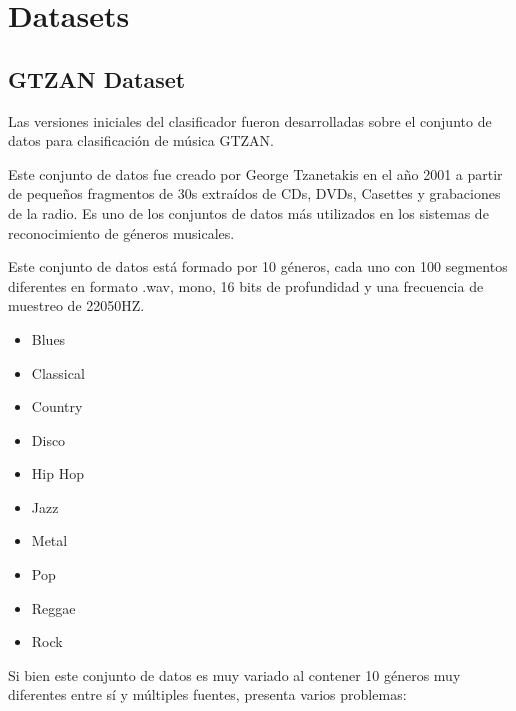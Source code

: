 
\section{Datasets}\label{datasets}

\hypertarget{gtzan-dataset}{%
\subsection{GTZAN Dataset}\label{gtzan-dataset}}

Las versiones iniciales del clasificador fueron desarrolladas sobre el
conjunto de datos para clasificación de música GTZAN.

Este conjunto de datos \cite{gtzan_paper} fue creado por George Tzanetakis en el año 2001 a
partir de pequeños fragmentos de 30s extraídos de CDs, DVDs, Casettes y
grabaciones de la radio. Es uno de los conjuntos de datos más utilizados
en los sistemas de reconocimiento de géneros musicales.

Este conjunto de datos está formado por 10 géneros, cada uno con 100
segmentos diferentes en formato .wav, mono, 16 bits de profundidad y una
frecuencia de muestreo de 22050HZ.

\begin{itemize}
\itemsep0em
\item
  Blues
\item
  Classical
\item
  Country
\item
  Disco
\item
  Hip Hop
\item
  Jazz
\item
  Metal
\item
  Pop
\item
  Reggae
\item
  Rock
\end{itemize}

Si bien este conjunto de datos es muy variado al contener 10 géneros muy diferentes entre sí y múltiples fuentes, presenta varios problemas:

